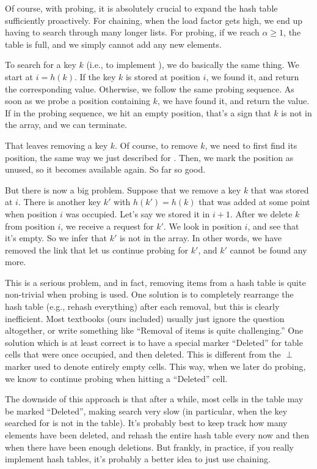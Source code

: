 Of course, with probing, it is absolutely crucial to expand the hash
table sufficiently proactively. For chaining, when the load factor
gets high, we end up having to search through many longer lists.
For probing, if we reach $\alpha \geq 1$, the table is full, and we
simply cannot add any new elements.

To search for a key $k$ (i.e., to implement ), we do basically
the same thing. We start at $i=h(k)$. If the key $k$ is stored at
position $i$, we found it, and return the corresponding value. 
Otherwise, we follow the same probing sequence. As soon as we probe a
position containing $k$, we have found it, and return the value.
If in the probing sequence, we hit an empty position, that's a sign
that $k$ is not in the array, and we can terminate.

That leaves removing a key $k$. Of course, to remove $k$, we need to
first find its position, the same way we just described for
. Then, we mark the position as unused, so it becomes
available again. So far so good.

But there is now a big problem. Suppose that we remove a key $k$ that
was stored at $i$. There is another key $k'$ with $h(k') = h(k)$
that was added at some point when position $i$ was occupied.
Let's say we stored it in $i+1$. 
After we delete $k$ from position $i$, we receive a 
request for $k'$. We look in position $i$, and see that it's empty.
So we infer that $k'$ is not in the array. In other words, we have
removed the link that let us continue probing for $k'$, and $k'$
cannot be found any more.

This is a serious problem, and in fact, removing items from a hash
table is quite non-trivial when probing is used. One solution is to
completely rearrange the hash table (e.g., rehash everything) after
each removal, but this is clearly inefficient. Most textbooks (ours
included) usually just ignore the question altogether, or write
something like ``Removal of items is quite challenging.'' 
One solution which is at least correct is to have a special marker
``Deleted'' for table cells that were once occupied, and then
deleted. This is different from the $\perp$ marker used to denote
entirely empty cells. This way, when we later do probing, we know to
continue probing when hitting a ``Deleted'' cell.

The downside of this approach is that after a while, most cells in the
table may be marked ``Deleted'', making search very slow (in
particular, when the key searched for is not in the table).
It's probably best to keep track how many elements have been deleted,
and rehash the entire hash table every now and then when there have
been enough deletions.
But frankly, in practice, if you really implement hash tables, it's
probably a better idea to just use chaining.

